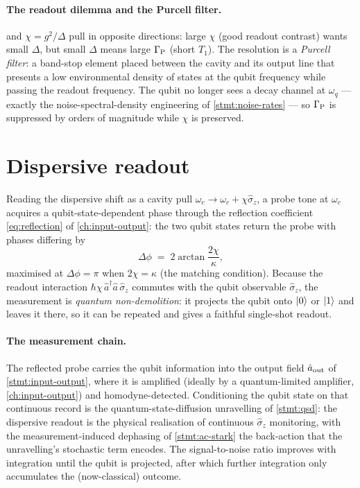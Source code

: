 \paragraph{The readout dilemma and the Purcell filter.}
 and $\chi=g^2/\Delta$ pull in opposite
directions: large $\chi$ (good readout contrast) wants small
$\Delta$, but small $\Delta$ means large $\Gamma_{\rm P}$ (short
$T_1$). The resolution is a \emph{Purcell filter}: a band-stop
element placed between the cavity and its output line that presents
a low environmental density of states at the qubit frequency while
passing the readout frequency. The qubit no longer sees a decay
channel at $\omega_q$ --- exactly the noise-spectral-density
engineering of \cref{stmt:noise-rates} --- so $\Gamma_{\rm P}$ is
suppressed by orders of magnitude while $\chi$ is preserved.

\section{Dispersive readout}
\label{sec:readout}

\begin{statement}
\label{stmt:dispersive-readout}
Reading the dispersive shift as a cavity pull $\omega_c\to\omega_c+\chi\hat\sigma_z$,
a probe tone at $\omega_c$ acquires a qubit-state-dependent phase
through the reflection coefficient \cref{eq:reflection} of
\cref{ch:input-output}: the two qubit states return the probe with
phases differing by
\begin{equation}
\label{eq:readout-contrast}
\Delta\phi \;=\; 2\arctan\frac{2\chi}{\kappa},
\end{equation}
maximised at $\Delta\phi=\pi$ when $2\chi=\kappa$ (the matching
condition). Because the readout interaction
$\hbar\chi\,\hat a^\dagger\hat a\,\hat\sigma_z$ commutes with the
qubit observable $\hat\sigma_z$, the measurement is \emph{quantum
non-demolition}: it projects the qubit onto $\ket0$ or $\ket1$ and
leaves it there, so it can be repeated and gives a faithful
single-shot readout.
\end{statement}

\paragraph{The measurement chain.}
The reflected probe carries the qubit information into the output
field $\hat a_{\rm out}$ of \cref{stmt:input-output}, where it is
amplified (ideally by a quantum-limited amplifier,
\cref{ch:input-output}) and homodyne-detected. Conditioning the
qubit state on that continuous record is the
quantum-state-diffusion unravelling of
\cref{stmt:qsd}: the dispersive readout is the physical realisation
of continuous $\hat\sigma_z$ monitoring, with the
measurement-induced dephasing of \cref{stmt:ac-stark} the
back-action that the unravelling's stochastic term encodes. The
signal-to-noise ratio improves with integration until the qubit is
projected, after which further integration only accumulates the
(now-classical) outcome.

